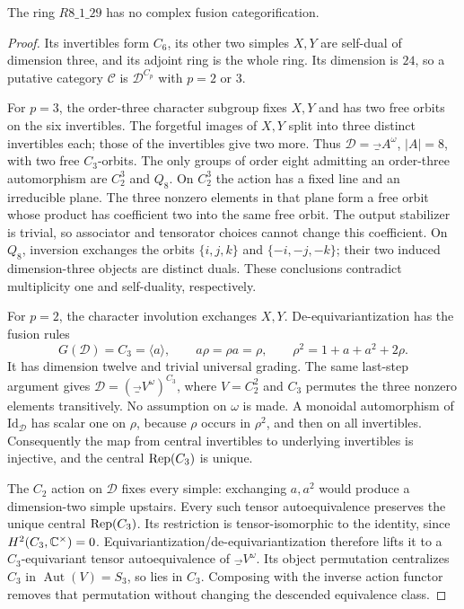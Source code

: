 \begin{proposition}\label{prop:dim24}
The ring $R8\_1\_29$ has no complex fusion categorification.
\end{proposition}
\begin{proof}
Its invertibles form $C_6$, its other two simples $X,Y$ are self-dual of dimension three, and its adjoint ring is the whole ring. Its dimension is $24$, so a putative category $\mathcal C$ is $\mathcal D^{C_p}$ with $p=2$ or $3$.

For $p=3$, the order-three character subgroup fixes $X,Y$ and has two free orbits on the six invertibles. The forgetful images of $X,Y$ split into three distinct invertibles each; those of the invertibles give two more. Thus $\mathcal D=\Vec_A^\omega$, $|A|=8$, with two free $C_3$-orbits. The only groups of order eight admitting an order-three automorphism are $C_2^3$ and $Q_8$. On $C_2^3$ the action has a fixed line and an irreducible plane. The three nonzero elements in that plane form a free orbit whose product has coefficient two into the same free orbit. The output stabilizer is trivial, so associator and tensorator choices cannot change this coefficient. On $Q_8$, inversion exchanges the orbits $\{i,j,k\}$ and $\{-i,-j,-k\}$; their two induced dimension-three objects are distinct duals. These conclusions contradict multiplicity one and self-duality, respectively.

For $p=2$, the character involution exchanges $X,Y$. De-equivariantization has the fusion rules
\[
G(\mathcal D)=C_3=\langle a\rangle,\qquad a\rho=\rho a=\rho,
\qquad \rho^2=1+a+a^2+2\rho.
\]
It has dimension twelve and trivial universal grading. The same last-step argument gives
$\mathcal D=(\Vec_V^\omega)^{C_3}$, where $V=C_2^2$ and $C_3$ permutes the three nonzero elements transitively. No assumption on $\omega$ is made. A monoidal automorphism of $\mathrm{Id}_{\mathcal D}$ has scalar one on $\rho$, because $\rho$ occurs in $\rho^2$, and then on all invertibles. Consequently the map from central invertibles to underlying invertibles is injective, and the central $\operatorname{Rep}(C_3)$ is unique.

The $C_2$ action on $\mathcal D$ fixes every simple: exchanging $a,a^2$ would produce a dimension-two simple upstairs. Every such tensor autoequivalence preserves the unique central $\operatorname{Rep}(C_3)$. Its restriction is tensor-isomorphic to the identity, since $H^2(C_3,\mathbb C^\times)=0$. Equivariantization/de-equivariantization \cite[Theorem~4.18(i) and Proposition~4.19]{DGNO} therefore lifts it to a $C_3$-equivariant tensor autoequivalence of $\Vec_V^\omega$. Its object permutation centralizes $C_3$ in $\operatorname{Aut}(V)=S_3$, so lies in $C_3$. Composing with the inverse action functor removes that permutation without changing the descended equivalence class.


\end{proof}
